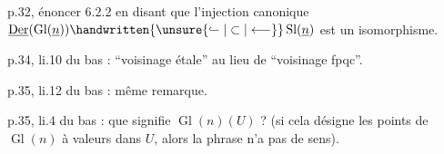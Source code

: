 p.32,  énoncer 6.2.2 en disant que l'injection canonique $\underline{\operatorname{Der}}(\operatorname{Gl}(\underline{n}))\handwritten{\unsure{\lhook\joinrel\relbar|\subset|\longleftarrow}}\operatorname{Sl}(\underline{n})$ est un isomorphisme. 

p.34, li.10 du bas : ``voisinage étale'' au lieu de ``voisinage fpqc''.

p.35, li.12 du bas : même remarque.

p.35, li.4 du bas : que signifie $\operatorname{Gl}(n)(U)$ ? (si cela désigne les points de $\operatorname{Gl}(n)$ à valeurs dans $U$, alors la phrase n'a pas de sens).
